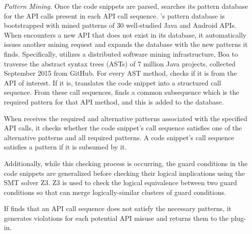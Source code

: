 {\it Pattern Mining.} 
Once the code snippets are parsed, {\soa} searches its pattern database for the API calls present in each API call sequence. {\soa}'s pattern database is bootstrapped with mined patterns of 30 well-studied Java and Android APIs. When {\soa} encounters a new API that does not exist in its database, it automatically issues another mining request and expands the database with the new patterns it finds. Specifically, {\soa} utilizes a distributed software mining infrastructure, Boa  to traverse the abstract syntax trees (ASTs) of 7 million Java projects, collected September 2015 from GitHub. For every AST method, {\soa} checks if it is from the API of interest. If it is, {\soa} translates the code snippet into a structured call sequence. From these call sequences, {\soa} finds a common subsequence which is the required pattern for that API method, and this is added to the database.

When {\soa} receives the required and alternative patterns associated with the specified API calls, it checks whether the code snippet's call sequence satisfies one of the alternative patterns and all required patterns. A code snippet's call sequence satisfies a pattern if it is subsumed by it.

Additionally, while this checking process is occurring, the guard conditions in the code snippets are generalized before checking their logical implications using the SMT solver Z3. Z3 is used to check the logical equivalence between two guard conditions so that {\soa} can merge logically-similar clusters of guard conditions.

If {\soa} finds that an API call sequence does not satisfy the necessary patterns, it generates violations for each potential API misuse and returns them to the plug-in.

